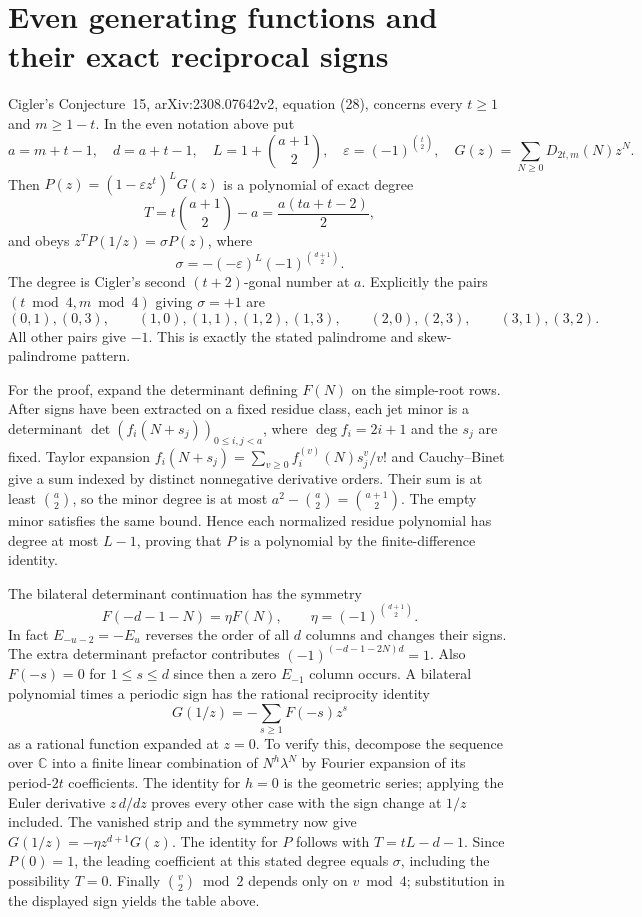 \documentclass[11pt,a4paper]{article}
\theoremstyle{definition}\newtheorem{problem}[theorem]{Auxiliary problem}
\theoremstyle{remark}\newtheorem*{remark}{Remark}
\begin{document}
\section{Even generating functions and their exact reciprocal signs}
Cigler's Conjecture~15, arXiv:2308.07642v2, equation (28), concerns every $t\ge1$ and $m\ge1-t$. In the even notation above put
\[
 a=m+t-1,\quad d=a+t-1,\quad L=1+\binom{a+1}{2},\quad
 \varepsilon=(-1)^{\binom t2},\quad
 G(z)=\sum_{N\ge0}D_{2t,m}(N)z^N.
\]
Then $P(z)=(1-\varepsilon z^t)^L G(z)$ is a polynomial of exact degree
\[
 T=t\binom{a+1}{2}-a=\frac{a(ta+t-2)}2,
\]
and obeys $z^T P(1/z)=\sigma P(z)$, where
\[
 \sigma=-(-\varepsilon)^L(-1)^{\binom{d+1}{2}} .
\]
The degree is Cigler's second $(t+2)$-gonal number at $a$. Explicitly the pairs $(t\bmod4,m\bmod4)$ giving $\sigma=+1$ are
\[
 (0,1),(0,3),\qquad(1,0),(1,1),(1,2),(1,3),\qquad
 (2,0),(2,3),\qquad(3,1),(3,2).
\]
All other pairs give $-1$. This is exactly the stated palindrome and skew-palindrome pattern.

For the proof, expand the determinant defining $F(N)$ on the simple-root rows. After signs have been extracted on a fixed residue class, each jet minor is a determinant $\det(f_i(N+s_j))_{0\le i,j<a}$, where $\deg f_i=2i+1$ and the $s_j$ are fixed. Taylor expansion $f_i(N+s_j)=\sum_{v\ge0}f_i^{(v)}(N)s_j^v/v!$ and Cauchy--Binet give a sum indexed by distinct nonnegative derivative orders. Their sum is at least $\binom a2$, so the minor degree is at most $a^2-\binom a2=\binom{a+1}2$. The empty minor satisfies the same bound. Hence each normalized residue polynomial has degree at most $L-1$, proving that $P$ is a polynomial by the finite-difference identity.

The bilateral determinant continuation has the symmetry
\[
 F(-d-1-N)=\eta F(N),\qquad \eta=(-1)^{\binom{d+1}{2}}.
\]
In fact $E_{-u-2}=-E_u$ reverses the order of all $d$ columns and changes their signs. The extra determinant prefactor contributes $(-1)^{(-d-1-2N)d}=1$. Also $F(-s)=0$ for $1\le s\le d$ since then a zero $E_{-1}$ column occurs. A bilateral polynomial times a periodic sign has the rational reciprocity identity
\[
 G(1/z)=-\sum_{s\ge1} F(-s)z^s
\]
as a rational function expanded at $z=0$. To verify this, decompose the sequence over $\mathbb C$ into a finite linear combination of $N^h\lambda^N$ by Fourier expansion of its period-$2t$ coefficients. The identity for $h=0$ is the geometric series; applying the Euler derivative $z\,d/dz$ proves every other case with the sign change at $1/z$ included. The vanished strip and the symmetry now give $G(1/z)=-\eta z^{d+1}G(z)$. The identity for $P$ follows with $T=tL-d-1$. Since $P(0)=1$, the leading coefficient at this stated degree equals $\sigma$, including the possibility $T=0$. Finally $\binom v2\bmod2$ depends only on $v\bmod4$; substitution in the displayed sign yields the table above.
\end{document}
